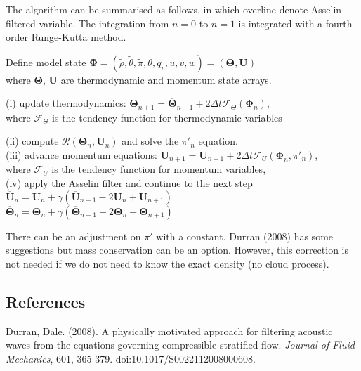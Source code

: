 \documentclass[a4paper,11pt]{article}
\begin{document}
The algorithm can be summarised as follows, in which overline denote Asselin-filtered variable. The integration from $n=0$ to $n=1$ is integrated with a fourth-order Runge-Kutta method. 

\begin{algorithm}
\begin{tcolorbox}[parbox=false, width=38em]

    Define model state $\mathbf{\Phi} = (\tilde{\rho},\tilde{\theta},\tilde{\pi},\theta,q_v,u,v,w) = (\mathbf{\Theta}, \mathbf{U})$\\[-1ex]         
    \qquad where $\mathbf{\Theta}$, $\mathbf{U}$ are thermodynamic and momentum state arrays.\\
    
     {
        (i) update thermodynamics: $\mathbf{\Theta}_{n+1} = \overline{\mathbf{\Theta}}_{n-1} + 2\Delta t \mathcal{F}_{\Theta}(\mathbf{\Phi}_n)$,\\[-1ex]
        \qquad where $\mathcal{F}_{\Theta}$ is the tendency function for thermodynamic variables%
        
        (ii) compute $\mathcal{R}(\mathbf{\Theta}_{n}, \mathbf{U}_n)$ and solve the $\pi'_{n}$ equation.\\[-1ex]
        
        
        (iii) advance momentum equations: $\mathbf{U}_{n+1} = \overline{\mathbf{U}}_{n-1} + 2\Delta t \mathcal{F}_{U}(\mathbf{\Phi}_n, \pi'_n)$,\\[-1ex]
        \qquad  where $\mathcal{F}_{U}$ is the tendency function for momentum variables,\\[-1ex]
        
        (iv) apply the Asselin filter and continue to the next step\\[-1ex] 
\qquad $\overline{\mathbf{U}}_n = \mathbf{U}_n + \gamma (\overline{\mathbf{U}}_{n-1} - 2\mathbf{U}_n + \mathbf{U}_{n+1})$\\[-1ex]    
\qquad $\overline{\mathbf{\Theta}}_n = \mathbf{\Theta}_n + \gamma (\overline{\mathbf{\Theta}}_{n-1} - 2\mathbf{\Theta}_n + \mathbf{\Theta}_{n+1})$        
        }        
\end{tcolorbox}    
\end{algorithm}

There can be an adjustment on $\pi'$ with a constant. Durran (2008) has some suggestions but mass conservation can be an option. However, this correction is not needed if we do not need to know the exact density (no cloud process).

\subsection*{References}
Durran, Dale. (2008). A physically motivated approach for filtering acoustic waves from the equations governing compressible stratified flow. \textit{Journal of Fluid Mechanics}, 601, 365-379. doi:10.1017/S0022112008000608.
\end{document}

